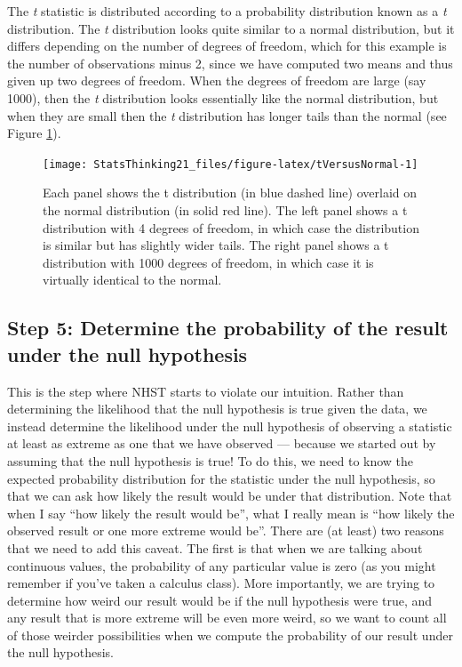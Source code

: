 \documentclass[12pt,]{book}
\theoremstyle{definition}
\theoremstyle{definition}
\theoremstyle{definition}
\theoremstyle{remark}
\begin{document}
The \emph{t} statistic is distributed according to a probability distribution known as a \emph{t} distribution. The \emph{t} distribution looks quite similar to a normal distribution, but it differs depending on the number of degrees of freedom, which for this example is the number of observations minus 2, since we have computed two means and thus given up two degrees of freedom. When the degrees of freedom are large (say 1000), then the \emph{t} distribution looks essentially like the normal distribution, but when they are small then the \emph{t} distribution has longer tails than the normal (see Figure \ref{fig:tVersusNormal}).

\begin{figure}
\texttt{[image: StatsThinking21\_files/figure-latex/tVersusNormal-1]} \caption{Each panel shows the t distribution (in blue dashed line) overlaid on the normal distribution (in solid red line).  The left panel shows a t distribution with 4 degrees of freedom, in which case the distribution is similar but has slightly wider tails.  The right panel shows a t distribution with 1000 degrees of freedom, in which case it is virtually identical to the normal.}\label{fig:tVersusNormal}
\end{figure}

\hypertarget{step-5-determine-the-probability-of-the-result-under-the-null-hypothesis}{%
\subsection{Step 5: Determine the probability of the result under the null hypothesis}\label{step-5-determine-the-probability-of-the-result-under-the-null-hypothesis}}

This is the step where NHST starts to violate our intuition. Rather than determining the likelihood that the null hypothesis is true given the data, we instead determine the likelihood under the null hypothesis of observing a statistic at least as extreme as one that we have observed --- because we started out by assuming that the null hypothesis is true! To do this, we need to know the expected probability distribution for the statistic under the null hypothesis, so that we can ask how likely the result would be under that distribution. Note that when I say ``how likely the result would be'', what I really mean is ``how likely the observed result or one more extreme would be''. There are (at least) two reasons that we need to add this caveat. The first is that when we are talking about continuous values, the probability of any particular value is zero (as you might remember if you've taken a calculus class). More importantly, we are trying to determine how weird our result would be if the null hypothesis were true, and any result that is more extreme will be even more weird, so we want to count all of those weirder possibilities when we compute the probability of our result under the null hypothesis.
\end{document}
